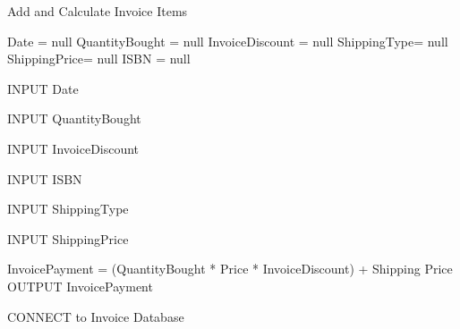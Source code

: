 \begin{algorithm}[H]
    \caption{Add and Calculate Invoice Items}
\begin{algorithmic}[1]



Date = null
QuantityBought = null
InvoiceDiscount = null
ShippingType= null
ShippingPrice= null
ISBN = null



    INPUT Date

\EndWhile


    INPUT QuantityBought

\EndWhile


    INPUT InvoiceDiscount

\EndWhile


    INPUT ISBN

\EndWhile


    INPUT ShippingType

\EndWhile


    INPUT ShippingPrice

\EndWhile


    InvoicePayment = (QuantityBought * Price * InvoiceDiscount) + Shipping Price
    OUTPUT InvoicePayment

\EndIf

    
    CONNECT to Invoice Database
    
\EndIf

\EndFunction
\end{algorithmic}
\end{algorithm}

